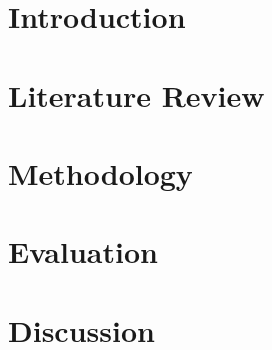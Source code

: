 \documentclass[12pt]{report}
\begin{document}
\pagestyle{empty}


\begin{abstract}

\end{abstract}

\renewcommand{\abstractname}{Acknowledgements}
\begin{abstract}
 
\end{abstract}

\tableofcontents

\chapter{Introduction}
\pagestyle{plain}


\chapter{Literature Review}


\chapter{Methodology}


\chapter{Evaluation}


\chapter{Discussion}





\end{document}
